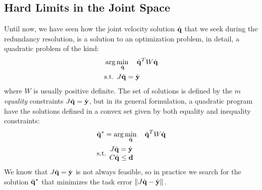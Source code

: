 \documentclass[10pt, a4paper]{report}
\begin{document}
\subsection{Hard Limits in the Joint Space}
Until now, we have seen how the joint velocity solution ${\dot{\mathbf q}}$ that we seek during the redundancy resolution, is a solution to an optimization problem, in detail, a quadratic problem of the kind:\begin{align}
    &\arg\min_{\dot{\mathbf q}}\quad {\dot{\mathbf q}}^T W{\dot{\mathbf q}}\\ 
    &\text{s.t. }J{\dot{\mathbf q}}={\dot{\mathbf y}}
\end{align}
where $W$ is usually positive definite. The set of solutions is defined by the $m$ \textit{equality} constraints $J{\dot{\mathbf q}}={\dot{\mathbf y}}$, but in its general formulation, a quadratic program have the solutions defined in a convex set given by both equality and inequality constraints:
\begin{align}
    &{\dot{\mathbf q}}^*=\arg\min_{\dot{\mathbf q}}\quad {\dot{\mathbf q}}^T W{\dot{\mathbf q}}\\ 
    &\text{s.t. }\begin{matrix}
        J{\dot{\mathbf q}}={\dot{\mathbf y}}\\ 
        C{\dot{\mathbf q}}\le \mathbf d
    \end{matrix}
\end{align}
We know that $J{\dot{\mathbf q}}={\dot{\mathbf y}}$ is not always feasible, so in practice we search for the solution ${\dot{\mathbf q}}^*$ that minimizes the task error $\|J{\dot{\mathbf q}}-{\dot{\mathbf y}}\|$. 
\end{document}
